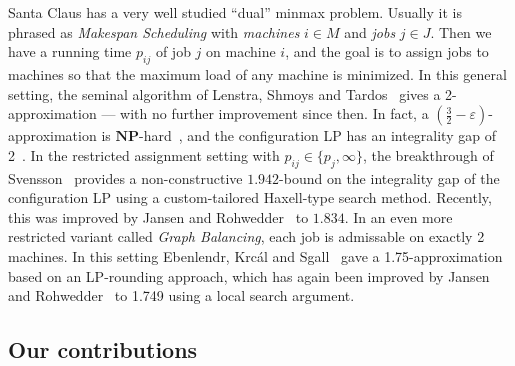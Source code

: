 Santa Claus has a very well studied ``dual'' minmax problem. 
Usually it is phrased as \emph{Makespan Scheduling} with \emph{machines} $i \in M$ 
and \emph{jobs} $j \in J$. Then we have a running time $p_{ij}$ of job $j$ on machine $i$, and the goal 
is to assign jobs to machines so that the maximum load of any machine is minimized.
In this general setting, the seminal algorithm of Lenstra, Shmoys and Tardos~\cite{SchedulingUnrelatedParallelMachines-LenstraShmoysTardos-FOCS87} gives a 2-approximation --- with no
further improvement since then. In fact, a $(\frac{3}{2}-\varepsilon)$-approximation is $\mathbf{NP}$-hard~\cite{SchedulingUnrelatedParallelMachines-LenstraShmoysTardos-FOCS87},
and the configuration LP has an integrality gap of 2~\cite{LowerBoundOnGapOfConfigurationLP-VerschaeWiese-ESA11}. In the restricted assignment setting
with $p_{ij} \in \{ p_j,\infty\}$, the breakthrough of Svensson~\cite{MakespanScheduling-Svensson-STOC11} provides a non-constructive $1.942$-bound on the integrality gap of the
configuration LP using a custom-tailored Haxell-type search method.
Recently, this was improved by Jansen and Rohwedder~\cite{ConfigurationLPforRestrictedAssignment-JansenRohwedderSODA17} to $1.834$. In an even more restricted variant called \emph{Graph Balancing}, each job is admissable on exactly 2 machines. In this setting Ebenlendr, Krc{\'{a}}l and Sgall~\cite{GraphBalancingEbenlendrKS-SODA08}
gave a 1.75-approximation based on an LP-rounding approach, which has again been improved by Jansen
and Rohwedder~\cite{GraphBalancing1.749-apx-with-local-search-Arxiv2018} to 1.749 using a local search argument.



\subsection{Our contributions}\label{sec: contributions}

